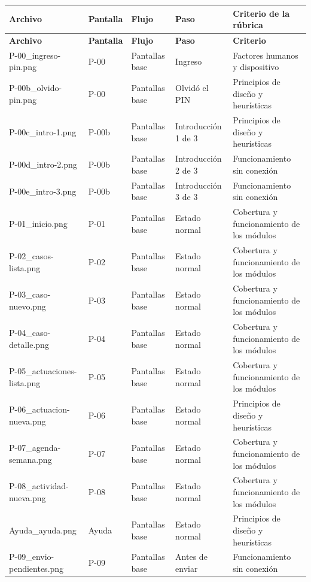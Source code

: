 \footnotesize
\setlength{\tabcolsep}{4pt}
\begin{longtable}{@{}p{4.2cm}p{1.1cm}p{2.2cm}p{3.2cm}p{3.4cm}@{}}
\toprule
\textbf{Archivo} & \textbf{Pantalla} & \textbf{Flujo} & \textbf{Paso} & \textbf{Criterio de la rúbrica} \\
\midrule
\endfirsthead
\toprule
\textbf{Archivo} & \textbf{Pantalla} & \textbf{Flujo} & \textbf{Paso} & \textbf{Criterio} \\
\midrule
\endhead
\bottomrule
\endfoot
P-00\_ingreso-pin.png & P-00 & Pantallas base & Ingreso & Factores humanos y dispositivo \\
P-00b\_olvido-pin.png & P-00 & Pantallas base & Olvidó el PIN & Principios de diseño y heurísticas \\
P-00c\_intro-1.png & P-00b & Pantallas base & Introducción 1 de 3 & Principios de diseño y heurísticas \\
P-00d\_intro-2.png & P-00b & Pantallas base & Introducción 2 de 3 & Funcionamiento sin conexión \\
P-00e\_intro-3.png & P-00b & Pantallas base & Introducción 3 de 3 & Funcionamiento sin conexión \\
P-01\_inicio.png & P-01 & Pantallas base & Estado normal & Cobertura y funcionamiento de los módulos \\
P-02\_casos-lista.png & P-02 & Pantallas base & Estado normal & Cobertura y funcionamiento de los módulos \\
P-03\_caso-nuevo.png & P-03 & Pantallas base & Estado normal & Cobertura y funcionamiento de los módulos \\
P-04\_caso-detalle.png & P-04 & Pantallas base & Estado normal & Cobertura y funcionamiento de los módulos \\
P-05\_actuaciones-lista.png & P-05 & Pantallas base & Estado normal & Cobertura y funcionamiento de los módulos \\
P-06\_actuacion-nueva.png & P-06 & Pantallas base & Estado normal & Principios de diseño y heurísticas \\
P-07\_agenda-semana.png & P-07 & Pantallas base & Estado normal & Cobertura y funcionamiento de los módulos \\
P-08\_actividad-nueva.png & P-08 & Pantallas base & Estado normal & Cobertura y funcionamiento de los módulos \\
Ayuda\_ayuda.png & Ayuda & Pantallas base & Estado normal & Principios de diseño y heurísticas \\
P-09\_envio-pendientes.png & P-09 & Pantallas base & Antes de enviar & Funcionamiento sin conexión \\

\end{longtable}
